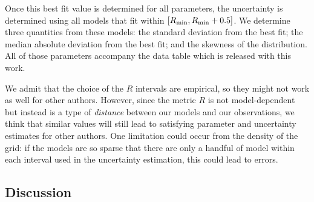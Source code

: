 Once this best fit value is determined for all parameters, the uncertainty is determined using all models that fit within $[R_\textrm{min},R_\textrm{min}+0.5]$. We determine three quantities from these models: the standard deviation from the best fit; the median absolute deviation from the best fit; and the skewness of the distribution. All of those parameters accompany the data table which is released with this work.

We admit that the choice of the $R$ intervals are empirical, so they might not work as well for other authors. However, since the metric $R$ is not model-dependent but instead is a type of \textit{distance} between our models and our observations, we think that similar values will still lead to satisfying parameter and uncertainty estimates for other authors. One limitation could occur from the density of the grid: if the models are so sparse that there are only a handful of model within each interval used in the uncertainty estimation, this could lead to errors. 






\subsection{Discussion}

